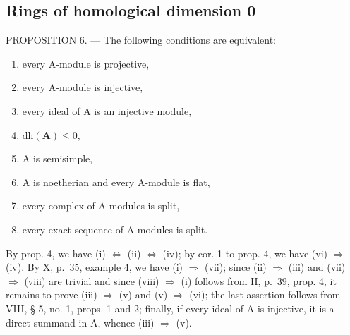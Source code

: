 \subsection{Rings of homological dimension 0}

PROPOSITION 6. --- The following conditions are equivalent:

\begin{enumerate}
\def\labelenumi{(\roman{enumi})}
\item
  every A-module is projective,
\item
  every A-module is injective,
\item
  every ideal of A is an injective module,
\item
  \(\mathrm{dh}(\mathbf{A})\leqslant 0,\)
\item
  A is semisimple,
\item
  A is noetherian and every A-module is flat,
\item
  every complex of A-modules is split,
\item
  every exact sequence of A-modules is split.
\end{enumerate}

By prop. 4, we have (i) \(\Leftrightarrow\) (ii) \(\Leftrightarrow\) (iv); by cor. 1 to prop. 4, we have (vi) \(\Rightarrow\) (iv). By X, p.~35, example 4, we have (i) \(\Rightarrow\) (vii); since (ii) \(\Rightarrow\) (iii) and (vii) \(\Rightarrow\) (viii) are trivial and since (viii) \(\Rightarrow\) (i) follows from II, p.~39, prop. 4, it remains to prove (iii) \(\Rightarrow\) (v) and (v) \(\Rightarrow\) (vi); the last assertion follows from VIII, § 5, no. 1, props. 1 and 2; finally, if every ideal of A is injective, it is a direct summand in A, whence (iii) \(\Rightarrow\) (v).

